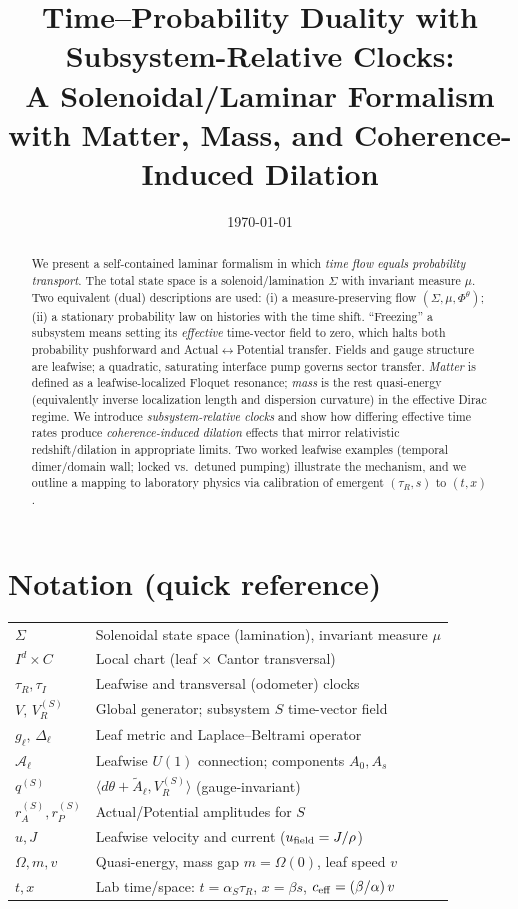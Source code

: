 \documentclass[11pt]{article}
\title{Time--Probability Duality with Subsystem-Relative Clocks:\\
A Solenoidal/Laminar Formalism with Matter, Mass, and Coherence-Induced Dilation}
\author{}
\date{\today}
\begin{document}
\maketitle

\begin{abstract}
We present a self-contained laminar formalism in which \emph{time flow equals probability transport}. The total state space is a solenoid/lamination $\Sigma$ with invariant measure $\mu$.
Two equivalent (dual) descriptions are used: (i) a measure-preserving flow $(\Sigma,\mu,\Phi^\theta)$; (ii) a stationary probability law on histories with the time shift. ``Freezing'' a subsystem means setting its \emph{effective} time-vector field to zero, which halts both probability pushforward and Actual$\leftrightarrow$Potential transfer. Fields and gauge structure are leafwise; a quadratic, saturating interface pump governs sector transfer. \emph{Matter} is defined as a leafwise-localized Floquet resonance; \emph{mass} is the rest quasi-energy (equivalently inverse localization length and dispersion curvature) in the effective Dirac regime. We introduce \emph{subsystem-relative clocks} and show how differing effective time rates produce \emph{coherence-induced dilation} effects that mirror relativistic redshift/dilation in appropriate limits. Two worked leafwise examples (temporal dimer/domain wall; locked vs.\ detuned pumping) illustrate the mechanism, and we outline a mapping to laboratory physics via calibration of emergent $(\tau_R,s)$ to $(t,x)$.
\end{abstract}

\tableofcontents

\section*{Notation (quick reference)}
\begin{tabular}{ll}
$\Sigma$ & Solenoidal state space (lamination), invariant measure $\mu$ \\
$I^d\times C$ & Local chart (leaf $\times$ Cantor transversal) \\
$\tau_R,\tau_I$ & Leafwise and transversal (odometer) clocks \\
$V,\,V_R^{(S)}$ & Global generator; subsystem $S$ time-vector field \\
$g_\ell,\,\Delta_\ell$ & Leaf metric and Laplace--Beltrami operator \\
$\mathcal A_\ell$ & Leafwise $U(1)$ connection; components $A_0,A_s$ \\
$q^{(S)}$ & $\langle d\theta+\tilde A_\ell, V_R^{(S)}\rangle$ (gauge-invariant) \\
$r_A^{(S)},r_P^{(S)}$ & Actual/Potential amplitudes for $S$ \\
$u,J$ & Leafwise velocity and current ($u_{\rm field}=J/\rho$) \\
$\Omega,m,v$ & Quasi-energy, mass gap $m=\Omega(0)$, leaf speed $v$ \\
$t,x$ & Lab time/space: $t=\alpha_S\tau_R$, $x=\beta s$, $c_{\rm eff}=(\beta/\alpha)\,v$
\end{tabular}
\end{document}
